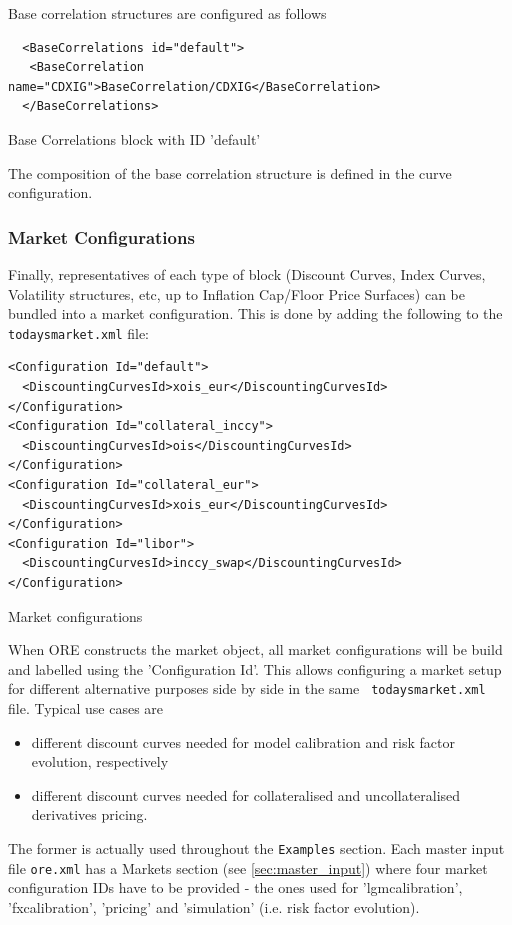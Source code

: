 \documentclass[12pt, a4paper]{article}
\begin{document}
Base correlation structures are configured as follows
\begin{listing}[H]
\begin{verbatim}
  <BaseCorrelations id="default">
   <BaseCorrelation name="CDXIG">BaseCorrelation/CDXIG</BaseCorrelation>
  </BaseCorrelations>
\end{verbatim}
\caption{Base Correlations block with ID 'default'}
\label{lst:basecorr_spec}
\end{listing}

The composition of the base correlation structure is defined in the curve configuration.

\subsubsection{Market Configurations}

Finally, representatives of each type of block (Discount Curves, Index Curves, Volatility structures, etc, up to
Inflation Cap/Floor Price Surfaces) can be bundled into a market configuration. This is done by adding the following to
the {\tt todaysmarket.xml} file:

\begin{listing}[H]
\begin{verbatim}
<Configuration Id="default">
  <DiscountingCurvesId>xois_eur</DiscountingCurvesId>
</Configuration>
<Configuration Id="collateral_inccy">
  <DiscountingCurvesId>ois</DiscountingCurvesId>
</Configuration>
<Configuration Id="collateral_eur">
  <DiscountingCurvesId>xois_eur</DiscountingCurvesId>
</Configuration>
<Configuration Id="libor">
  <DiscountingCurvesId>inccy_swap</DiscountingCurvesId>
</Configuration>
\end{verbatim}
\caption{Market configurations}
\label{lst:config_spec}
\end{listing}

When ORE constructs the market object, all market configurations will be build and labelled using the 'Configuration
Id'.  This allows configuring a market setup for different alternative purposes side by side in the same {\tt
  todaysmarket.xml} file. Typical use cases are
\begin{itemize}
\item different discount curves needed for model calibration and risk factor evolution, respectively
\item different discount curves needed for collateralised and uncollateralised derivatives pricing.
\end{itemize}
The former is actually used throughout the {\tt Examples} section. Each master input file {\tt ore.xml} has a Markets
section (see \ref{sec:master_input}) where four market configuration IDs have to be provided - the ones used for
'lgmcalibration', 'fxcalibration', 'pricing' and 'simulation' (i.e. risk factor evolution).
\end{document}
